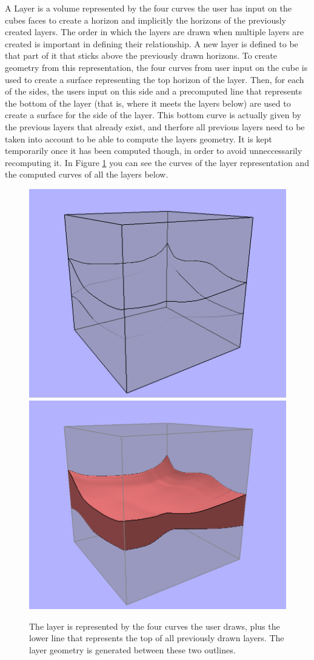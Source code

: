 \documentclass[a4paper,12pt]{report}
\begin{document}
A Layer is a volume represented by the four curves the user has input on the cubes faces to create a horizon and implicitly the horizons of the previously created layers. The order in which the layers are drawn when multiple layers are created is important in defining their relationship. A new layer is defined to be that part of it that sticks above the previously drawn horizons. To create geometry from this representation, the four curves from user input on the cube is used to create a surface representing the top horizon of the layer. Then, for each of the sides, the users input on this side and a precomputed line that represents the bottom of the layer (that is, where it meets the layers below) are used to create a surface for the side of the layer. This bottom curve is actually given by the previous layers that already exist, and therfore all previous layers need to be taken into account to be able to compute the layers geometry. It is kept temporarily once it has been computed though, in order to avoid 
unneccessarily recomputing it. In Figure \ref{fig:layerRep} you can see the curves of the layer representation and the computed curves of all the layers below.

\begin{figure}
\centering
\includegraphics[width=.3\linewidth]{thesis/layerRepresentation1.png}
\includegraphics[width=.3\linewidth]{thesis/layerRepresentation2.png}
 \caption{The layer is represented by the four curves the user draws, plus the lower line that represents the top of all previously drawn layers. The layer geometry is generated between these two outlines.}
 \label{fig:layerRep}
\end{figure}
\end{document}

